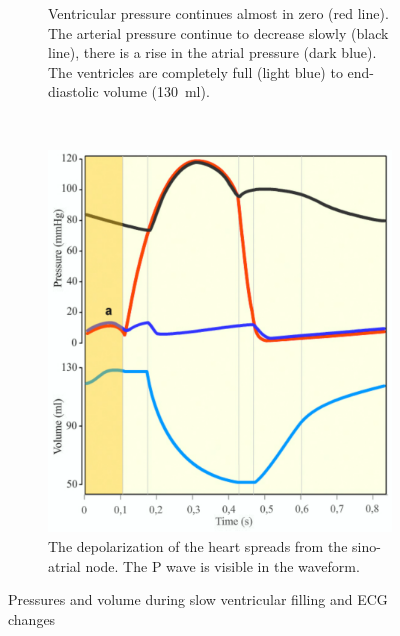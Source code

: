 \begin{figure}[!htpb]
	\begin{subfigure}[t]{0.48\textwidth}
		\centering
		\caption{Ventricular pressure continues almost in zero (red line). The arterial pressure continue to decrease slowly (black line), there is a rise in the atrial pressure (dark blue). The ventricles are completely full (light blue) to end-diastolic volume (\SI{130}{\milli\litre}).}
		\label{fig:heart atrial systole}
	\end{subfigure}
	~
	\begin{subfigure}[t]{0.48\textwidth}
		\centering
		\includegraphics[width=\textwidth,keepaspectratio]{figure_18}
		\caption{The depolarization of the heart spreads from the sino-atrial node. The P wave is visible in the waveform. }
		\label{fig:pressure atrial systole}
	\end{subfigure}
	\caption[Slow ventricular filling]{Pressures and volume during slow ventricular filling and ECG changes}
\end{figure}

